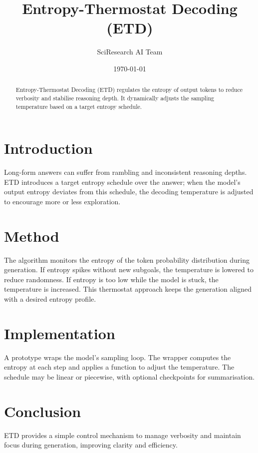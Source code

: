 \documentclass{article}
\title{Entropy-Thermostat Decoding (ETD)}
\author{SciResearch AI Team}
\date{\today}
\begin{document}
\maketitle
\begin{abstract}
Entropy-Thermostat Decoding (ETD) regulates the entropy of output tokens
to reduce verbosity and stabilise reasoning depth. It dynamically
adjusts the sampling temperature based on a target entropy schedule.
\end{abstract}
\section{Introduction}
Long-form answers can suffer from rambling and inconsistent reasoning
depths. ETD introduces a target entropy schedule over the answer; when
the model's output entropy deviates from this schedule, the decoding
temperature is adjusted to encourage more or less exploration.
\section{Method}
The algorithm monitors the entropy of the token probability
distribution during generation. If entropy spikes without new
subgoals, the temperature is lowered to reduce randomness. If entropy
is too low while the model is stuck, the temperature is increased. This
thermostat approach keeps the generation aligned with a desired entropy
profile.
\section{Implementation}
A prototype wraps the model's sampling loop. The wrapper computes the
entropy at each step and applies a function to adjust the temperature.
The schedule may be linear or piecewise, with optional checkpoints for
summarisation.
\section{Conclusion}
ETD provides a simple control mechanism to manage verbosity and
maintain focus during generation, improving clarity and efficiency.
\end{document}
